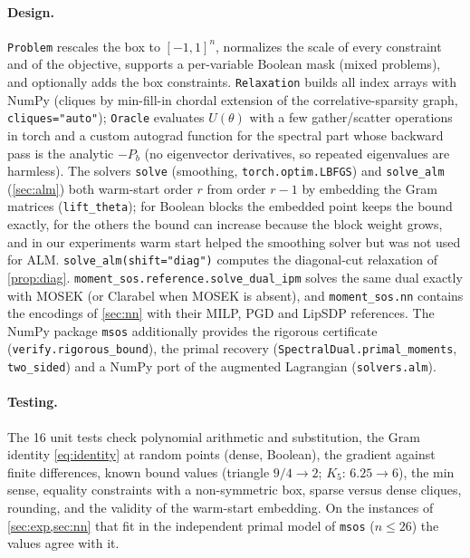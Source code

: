 \documentclass[a4paper,11pt]{article}
\theoremstyle{plain}
\theoremstyle{definition}
\theoremstyle{remark}
\begin{document}
\paragraph{Design.} \texttt{Problem} rescales the box to $[-1,1]^n$, normalizes the scale of every constraint and of the objective, supports a per-variable Boolean mask (mixed problems), and optionally adds the box constraints. \texttt{Relaxation} builds all index arrays with NumPy (cliques by min-fill-in chordal extension of the correlative-sparsity graph, \texttt{cliques="auto"}); \texttt{Oracle} evaluates $U(\theta)$ with a few gather/scatter operations in torch and a custom autograd function for the spectral part whose backward pass is the analytic $-P_b$ (no eigenvector derivatives, so repeated eigenvalues are harmless). The solvers \texttt{solve} (smoothing, \texttt{torch.optim.LBFGS}) and \texttt{solve\_alm} (\cref{sec:alm}) both warm-start order $r$ from order $r-1$ by embedding the Gram matrices (\texttt{lift\_theta}); for Boolean blocks the embedded point keeps the bound exactly, for the others the bound can increase because the block weight grows, and in our experiments warm start helped the smoothing solver but was not used for ALM. \texttt{solve\_alm(shift="diag")} computes the diagonal-cut relaxation of \cref{prop:diag}. \texttt{moment\_sos.reference.solve\_dual\_ipm} solves the same dual exactly with MOSEK (or Clarabel when MOSEK is absent), and \texttt{moment\_sos.nn} contains the encodings of \cref{sec:nn} with their MILP, PGD and LipSDP references. The NumPy package \texttt{msos} additionally provides the rigorous certificate (\texttt{verify.rigorous\_bound}), the primal recovery (\texttt{SpectralDual.primal\_moments}, \texttt{two\_sided}) and a NumPy port of the augmented Lagrangian (\texttt{solvers.alm}).
\paragraph{Testing.} The 16 unit tests check polynomial arithmetic and substitution, the Gram identity \eqref{eq:identity} at random points (dense, Boolean), the gradient against finite differences, known bound values (triangle $9/4\to2$; $K_5$: $6.25\to6$), the min sense, equality constraints with a non-symmetric box, sparse versus dense cliques, rounding, and the validity of the warm-start embedding. On the instances of \cref{sec:exp,sec:nn} that fit in the independent primal model of \texttt{msos} ($n\le26$) the values agree with it.
\end{document}
